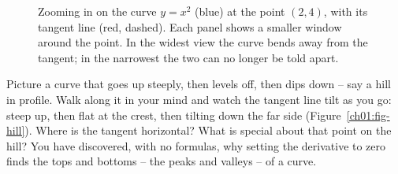 \begin{figure}[htbp]
\centering
{}
\caption{Zooming in on the curve $y=x^2$ (blue) at the point $(2,4)$, with its tangent line (red, dashed). Each panel shows a smaller window around the point. In the widest view the curve bends away from the tangent; in the narrowest the two can no longer be told apart.}
\label{ch01:fig-zoom}
\end{figure}

\begin{walkbox}
Picture a curve that goes up steeply, then levels off, then dips down -- say a
hill in profile. Walk along it in your mind and watch the tangent line tilt as
you go: steep up, then flat at the crest, then tilting down the far side
(Figure~\ref{ch01:fig-hill}). Where is the tangent horizontal? What is
special about that point on the hill? You have discovered, with no formulas,
why setting the derivative to zero finds the tops and bottoms -- the peaks and
valleys -- of a curve.
\end{walkbox}

